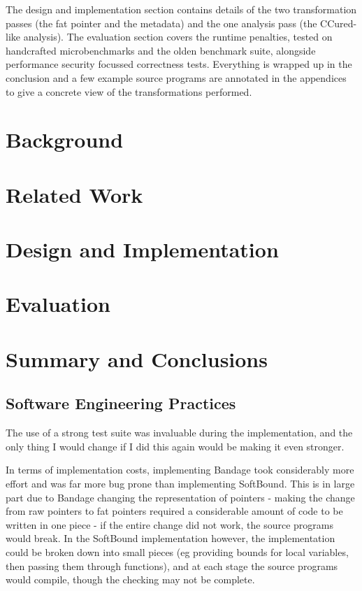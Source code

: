 \documentclass[a4paper,12pt,twoside,openright]{report}
\begin{document}
The design and implementation section contains details of the two transformation passes (the fat pointer and the metadata) and the one analysis pass (the CCured-like analysis).
The evaluation section covers the runtime penalties, tested on handcrafted microbenchmarks and the olden benchmark suite, alongside performance security focussed correctness tests.
Everything is wrapped up in the conclusion and a few example source programs are annotated in the appendices to give a concrete view of the transformations performed.

\chapter{Background} 


\chapter{Related Work} 


\chapter{Design and Implementation} 


\chapter{Evaluation} 


\chapter{Summary and Conclusions} 

\section{Software Engineering Practices}

The use of a strong test suite was invaluable during the implementation, and the only thing I would change if I did this again would be making it even stronger.

In terms of implementation costs, implementing Bandage took considerably more effort and was far more bug prone than implementing SoftBound.
This is in large part due to Bandage changing the representation of pointers - making the change from raw pointers to fat pointers required a considerable amount of code to be written in one piece - if the entire change did not work, the source programs would break.
In the SoftBound implementation however, the implementation could be broken down into small pieces (eg providing bounds for local variables, then passing them through functions), and at each stage the source programs would compile, though the checking may not be complete.
\end{document}
